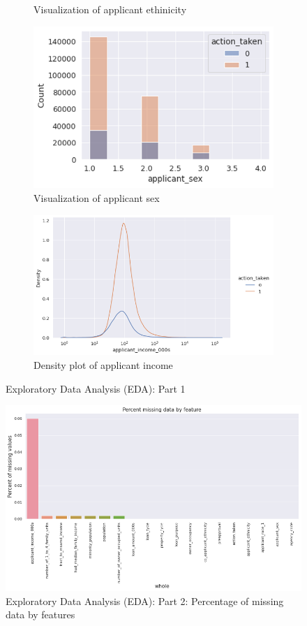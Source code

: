\documentclass{jpp}
\begin{document}
\begin{figure}
\begin{subfigure}{.5\textwidth}
  \caption{Visualization of applicant ethinicity}\label{EDA6}
\end{subfigure}
\begin{subfigure}{.5\textwidth}
  \centering
  \includegraphics[width=.9\linewidth]{EDA7.png}  
  \caption{Visualization of applicant sex}\label{EDA7}
\end{subfigure}
\begin{subfigure}{.5\textwidth}
  \centering
  \includegraphics[width=.9\linewidth]{EDA8.png}  
  \caption{Density plot of applicant income}\label{EDA8}
\end{subfigure}
\caption{Exploratory Data Analysis (EDA): Part 1}
\label{EDA}
\end{figure}

\begin{figure}
  \centering
  \includegraphics[width=.9\linewidth]{EDA9.png}  
  \caption{Exploratory Data Analysis (EDA): Part 2: Percentage of missing data by features}\label{EDA9}
\end{figure}
\end{document}

